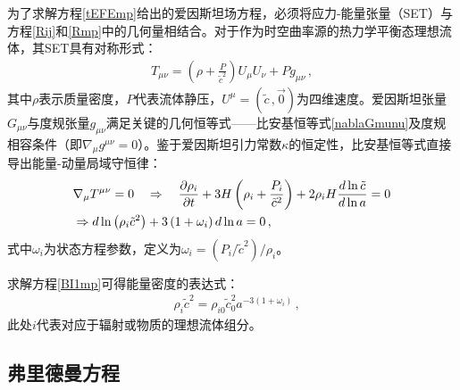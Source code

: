 \documentclass[jkps,preprint,fleqn]{revtex4}
\newcommand{\tc}{\tilde{c}}
\begin{document}
\begin{CJK*}{UTF8}{gbsn}
为了求解方程\eqref{tEFEmp}给出的爱因斯坦场方程，必须将应力-能量张量（SET）与方程\eqref{Rij}和\eqref{Rmp}中的几何量相结合。对于作为时空曲率源的热力学平衡态理想流体，其SET具有对称形式：
 \begin{align} T_{\mu\nu} = \left( \rho + \frac{P}{\tc^2} \right) U_{\mu} U_{\nu} + P g_{\mu\nu} \label{Tmunump} \,, \end{align}
 其中$\rho$表示质量密度，$P$代表流体静压，$U^{\mu} = (\tc\,,\vec{0})$为四维速度。爱因斯坦张量$G_{\mu\nu}$与度规张量$g_{\mu\nu}$满足关键的几何恒等式——比安基恒等式\eqref{nablaGmunu}及度规相容条件（即$\nabla_{\mu} g^{\mu\nu} = 0$）。鉴于爱因斯坦引力常数$\kappa$的恒定性，比安基恒等式直接导出能量-动量局域守恒律：
 \begin{align} &\nabla_{\mu} \tensor{T}{^\mu^\nu} = 0 \quad \Rightarrow \quad \frac{\partial \rho_i}{\partial t} + 3 H \left( \rho_i + \frac{P_i}{\tc^2} \right) + 2 \rho_i H \frac{d \ln \tc}{d \ln a} = 0 \nonumber \\ &\Rightarrow d \ln \left( \rho_i \tc^2 \right) + 3 \left( 1 + \omega_i \right) d \ln a = 0 \label{BI1mp} \,, \end{align}
 式中$\omega_i$为状态方程参数，定义为$\omega_i = (P_i/\tc^2)/\rho_i$。

求解方程\eqref{BI1mp}可得能量密度的表达式：
 \begin{align} &\rho_i \tc^{2} = \rho_{i0} \tc_0^2 a^{-3 (1 + \omega_i)} \label{rhomp} \,,\end{align}
 此处$i$代表对应于辐射或物质的理想流体组分。
\subsection{弗里德曼方程}\label{subsec:FE}


\end{CJK*}
\end{document}
